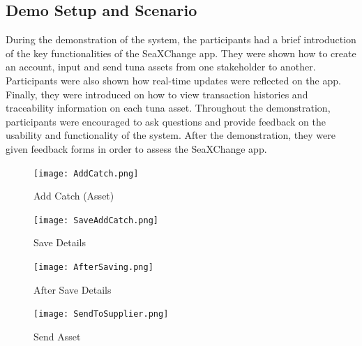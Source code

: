 \subsection{Demo Setup and Scenario}
During the demonstration of the system, the participants had a brief introduction of the key functionalities of the SeaXChange app. They were shown how to create an account, input and send tuna assets from one stakeholder to another. Participants were also shown how real-time updates were reflected on the app. Finally, they were introduced on how to view transaction histories and traceability information on each tuna asset. Throughout the demonstration, participants were encouraged to ask questions and provide feedback on the usability and functionality of the system. After the demonstration, they were given feedback forms in order to assess the SeaXChange app. 

\begin{figure}[H]
	\centering
	\texttt{[image: AddCatch.png]}
	\caption{Add Catch (Asset)}
	\label{fig:add_catch}
\end{figure}

\begin{figure}[H]
	\centering
	\texttt{[image: SaveAddCatch.png]}
	\caption{Save Details}
	\label{fig:save_details}
\end{figure}

\begin{figure}[H]
	\centering
	\texttt{[image: AfterSaving.png]}
	\caption{After Save Details}
	\label{fig:after_save}
\end{figure}

\begin{figure}[H]
	\centering
	\texttt{[image: SendToSupplier.png]}
	\caption{Send Asset}
	\label{fig:sendto_supplier}
\end{figure}


